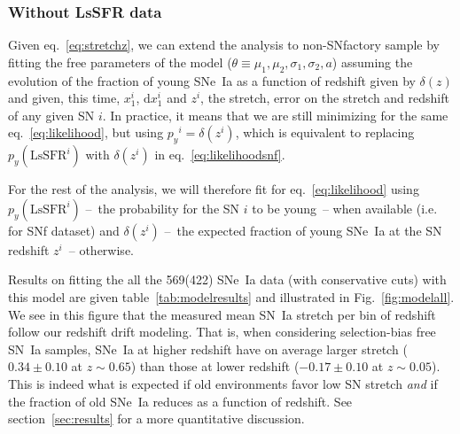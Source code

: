 \documentclass[]{aa} %
\newcommand{\mr}[1]{{\textcolor[rgb]{0.60,0.10,0.6}{#1}}}
\newcommand{\nn}[1]{{\textcolor[rgb]{1, 0.27, 0}{#1}}}
\begin{document}
\subsubsection{Without LsSFR data}
\label{sec:modelnopy}

Given eq.~\ref{eq:stretchz}, we can extend the analysis to non-SNfactory sample
by fitting the free parameters of the model ($\theta\equiv{\mu_1, \mu_2,
\sigma_1, \sigma_2, a}$) assuming the evolution of the fraction of young SNe~Ia
as a function of redshift given by $\delta(z)$ and given, this time, $x_1^{i}$,
$\mathrm{d}x^{i}_{1}$ and $z^{i}$, the stretch, error on the stretch and
redshift of any given SN $i$. In practice, it means that we are still minimizing
for the same eq.~\ref{eq:likelihood}, but \nn{using $p_y{}^i = \delta(z^{i})$,
which is equivalent to replacing $p_y(\mathrm{LsSFR}^i)$ with $\delta(z^i)$ in
eq.~\ref{eq:likelihoodsnf}.}

\mr{For the rest of the analysis, we will therefore fit for
eq.~\ref{eq:likelihood} using \nn{$p_y(\mathrm{LsSFR}^i)$} --~the
probability for the SN $i$ to be young~-- when available (i.e. for SNf
dataset) and $\delta(z^{i})$ --~the expected fraction of young SNe~Ia at the
SN redshift $z^{i}$~-- otherwise.}

\mr{Results on fitting the all the 569(422) SNe~Ia data (with conservative cuts)
with this model are given table~\ref{tab:modelresults} and illustrated in
Fig.~\ref{fig:modelall}. We see in this figure that the measured mean SN~Ia
stretch per bin of redshift follow our redshift drift modeling. That is, when
considering selection-bias free SN~Ia samples, SNe~Ia at higher redshift have on
average larger stretch ($0.34 \pm 0.10$ at $z\sim0.65$) than those at lower
redshift ($-0.17\pm 0.10$ at $z\sim0.05$). This is indeed what is expected if
old environments favor low SN stretch \citep[e.g.]{howell2007} \textit{and} if
the fraction of old SNe~Ia reduces as a function of redshift. See
section~\ref{sec:results} for a more quantitative discussion.}
\end{document}
